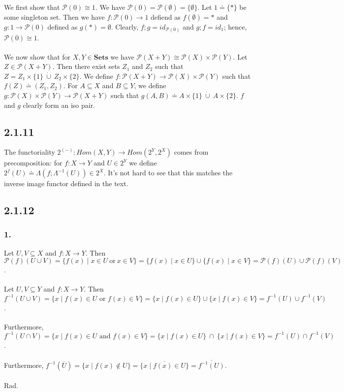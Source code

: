 \documentclass{article}
\newcommand{\mbf}{\mathbf}
\begin{document}
We first show that $\mathcal P(0) \cong 1$. We have $\mathcal P(0) = \mathcal P(\emptyset) = \{ \emptyset \}$. 
Let $1 \doteq \{ \ast \}$ be some singleton set. Then we have $f : \mathcal P(0) \to 1$ defiend as $f(\emptyset) = \ast$
and $g : 1 \to \mathcal P(0)$ defined as $g(\ast) = \emptyset$. Clearly, $f;g = id_{\mathcal P(0)}$ and $g;f = id_{1}$;
hence, $\mathcal P(0) \cong 1$.\\~\\
We now show that for $X,Y \in \mbf{Sets}$ we have $\mathcal P(X + Y) \cong \mathcal P(X) \times \mathcal P(Y)$.
Let $Z \in \mathcal P(X + Y)$. Then there exist sets $Z_1$ and $Z_2$ such that 
$Z = Z_1 \times \{ 1 \}~\dot{\cup}~Z_2 \times \{ 2 \}$. We define $f : \mathcal P(X + Y) \to \mathcal P(X) \times \mathcal P(Y)$
such that $f(Z) \doteq (Z_1,Z_2)$. For $A \subseteq X$ and $B \subseteq Y$, we define 
$g : \mathcal P(X) \times \mathcal P(Y) \to \mathcal P(X + Y)$ such that $g(A,B) \doteq A \times \{ 1 \}~\dot{\cup}~A \times \{ 2 \}$. $f$ and $g$ clearly form an iso pair.

\subsection*{2.1.11}

The functoriality $2^{(-)} : Hom(X,Y) \to Hom(2^Y, 2^X)$ comes from precomposition: for $f : X \to Y$ and $U \in 2^Y$ 
we define $2^f(U) \doteq \Lambda(f;\Lambda^{-1}(U)) \in 2^X$. It's not hard to see that this matches the inverse image
functor defined in the text.

\subsection*{2.1.12}

\subsubsection*{1.}

Let $U,V \subseteq X$ and $f : X \to Y$. Then $\mathcal P(f)(U \cup V) = \{ f(x) \mid x \in U~\text{or}~x \in V \}
= \{ f(x) \mid x \in U \} \cup \{ f(x) \mid x \in V \} = \mathcal P(f)(U) \cup \mathcal P(f)(V)$.\\~\\
Let $U,V \subseteq Y$ and $f : X \to Y$. Then $f^{-1}(U \cup V) = \{ x \mid f(x) \in U \text{ or } f(x) \in V \} =
\{ x \mid f(x) \in U \} \cup \{ x \mid f(x) \in V \} = f^{-1}(U) \cup f^{-1}(V)$.\\~\\
Furthermore, $f^{-1}(U \cap V) = \{ x \mid f(x) \in U \text{ and } f(x) \in V \} = \{ x \mid f(x) \in U \}~\cap~ 
\{ x \mid f(x) \in V \} = f^{-1}(U) \cap f^{-1}(V)$.\\~\\
Furthermore, $f^{-1}(\overline{U}) = \{ x \mid f(x) \not \in U \} = \overline{\{ x \mid f(x) \in U\}} = \overline{f^{-1}(U)}$.\\~\\
Rad.
\end{document}
